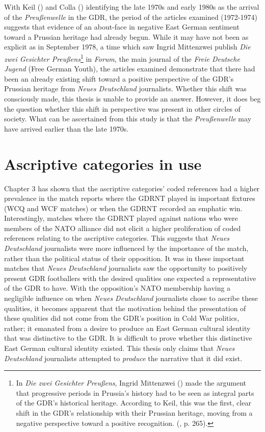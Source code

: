 With Keil (\citeyear{keil2016}) and Colla (\citeyear{colla2019}) identifying the late 1970s and early 1980s as the arrival of the \textit{Preußenwelle} in the GDR, the period of the articles examined (1972-1974) suggests that evidence of an about-face in negative East German sentiment toward a Prussian heritage had already begun. While it may have not been as explicit as in September 1978, a time which saw Ingrid Mittenzwei publish \textit{Die zwei Gesichter Preußens}\footnote{In \textit{Die zwei Gesichter Preußens}, Ingrid Mittenzwei (\citeyear{mittenzwei1978}) made the argument that progressive periods in Prussia’s history had to be seen as integral parts of the GDR’s historical heritage. According to Keil, this was the first, clear shift in the GDR’s relationship with their Prussian heritage, moving from a negative perspective toward a positive recognition.  (\cite{keil2016}, p. 265).} in \textit{Forum}, the main journal of the \textit{Freie Deutsche Jugend} (Free German Youth), the articles examined demonstrate that there had been an already existing shift toward a positive perspective of the GDR’s Prussian heritage from \textit{Neues Deutschland} journalists. Whether this shift was consciously made, this thesis is unable to provide an answer. However, it does beg the question whether this shift in perspective was present in other circles of society. What can be ascertained from this study is that the \textit{Preußenwelle} may have arrived earlier than the late 1970s.

\section*{Ascriptive categories in use}

Chapter 3 has shown that the ascriptive categories’ coded references had a higher prevalence in the match reports where the GDRNT played in important fixtures (WCQ and WCF matches) or when the GDRNT recorded an emphatic win. Interestingly, matches where the GDRNT played against nations who were members of the NATO alliance did not elicit a higher proliferation of coded references relating to the ascriptive categories. This suggests that \textit{Neues Deutschland} journalists were more influenced by the importance of the match, rather than the political status of their opposition. It was in these important matches that \textit{Neues Deutschland} journalists saw the opportunity to positively present GDR footballers with the desired qualities one expected a representative of the GDR to have. With the opposition’s NATO membership having a negligible influence on when \textit{Neues Deutschland} journalists chose to ascribe these qualities, it becomes apparent that the motivation behind the presentation of these qualities did not come from the GDR’s position in Cold War politics, rather; it emanated from a desire to produce an East German cultural identity that was distinctive to the GDR. It is difficult to prove whether this distinctive East German cultural identity existed. This thesis only claims that \textit{Neues Deutschland} journalists attempted to \textit{produce} the narrative that it did exist.


